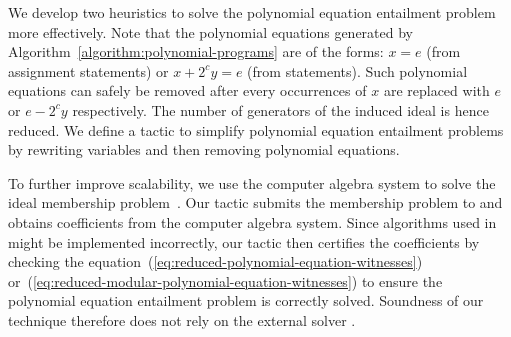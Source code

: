 We develop two heuristics to solve the polynomial equation
entailment problem more effectively. Note that the polynomial equations
generated by Algorithm~\ref{algorithm:polynomial-programs} are of the  
forms: $x = e$ (from assignment statements) or $x + 2^c y
= e$ (from  statements). Such polynomial equations can
safely be removed after every occurrences of $x$ are replaced with $e$
or $e - 2^c y$ respectively. The number of generators of the induced
ideal is hence reduced. We define a \coq
tactic to simplify polynomial equation entailment problems by 
rewriting variables and then removing polynomial equations.

To further improve scalability, we use the computer algebra system
\singular to solve the ideal membership problem~\cite{GP:08:SICA}. 
Our tactic submits the membership problem to \singular and 
obtains coefficients from the computer algebra system. 
Since algorithms used in \singular might be implemented incorrectly, 
our \coq
tactic then certifies the coefficients by checking the
equation~(\ref{eq:reduced-polynomial-equation-witnesses})
or~(\ref{eq:reduced-modular-polynomial-equation-witnesses}) to ensure
the polynomial equation entailment problem is correctly
solved. Soundness of our technique therefore does not rely on the
external solver \singular.

